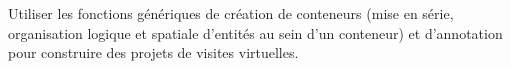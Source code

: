 \startchapter[title={Visites Virtuelles}]

\idea{}
Utiliser les fonctions génériques de création de conteneurs (mise en série, organisation logique et spatiale d'entités au sein d'un conteneur) et d'annotation pour construire des projets de visites virtuelles.